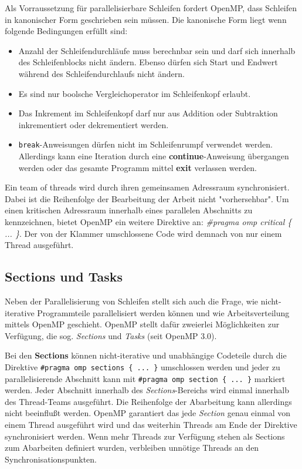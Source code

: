 \documentclass[11pt]{scrartcl}
\begin{document}
Als Vorraussetzung für parallelisierbare Schleifen fordert OpenMP, dass Schleifen in kanonischer Form geschrieben sein müssen. Die kanonische Form liegt wenn folgende Bedingungen erfüllt sind: 
\begin{itemize}
\item Anzahl der Schleifendurchläufe muss berechnbar sein und darf sich innerhalb des Schleifenblocks nicht ändern. Ebenso dürfen sich Start und Endwert während des Schleifendurchlaufs nicht ändern.
\item Es sind nur boolsche Vergleichoperator im Schleifenkopf erlaubt.
\item Das Inkrement im Schleifenkopf darf nur aus Addition oder Subtraktion inkrementiert oder dekrementiert werden. 
\item \texttt{break}-Anweisungen dürfen nicht im Schleifenrumpf verwendet werden. Allerdings kann eine Iteration durch eine \textbf{continue}-Anweisung übergangen werden oder das gesamte Programm mittel \textbf{exit} verlassen werden.
\end{itemize}

Ein team of threads wird durch ihren gemeinsamen Adressraum synchronisiert. Dabei ist die Reihenfolge der Bearbeitung der Arbeit nicht "vorhersehbar". Um einen kritischen Adressraum innerhalb eines parallelen Abschnitts zu kennzeichnen, bietet OpenMP ein weitere Direktive an: \textit{\#pragma omp critical \{ ... \}}. Der von der Klammer umschlossene Code wird demnach von nur einem Thread ausgeführt. 

\subsection{Sections und Tasks}

Neben der Parallelisierung von Schleifen stellt sich auch die Frage, wie nicht-iterative Programmteile parallelisiert werden können und  wie Arbeitsverteilung mittels OpenMP geschieht. OpenMP stellt dafür zweierlei Möglichkeiten zur Verfügung, die sog. \textit{Sections} und \textit{Tasks} (seit OpenMP 3.0).

Bei den \textbf{Sections} können nicht-iterative und unabhängige Codeteile durch die Direktive \texttt{\#pragma omp sections \{ ... \}} umschlossen werden und jeder zu parallelisierende Abschnitt kann mit \texttt{\#pragma omp section \{ ... \}} markiert werden. Jeder Abschnitt innerhalb des \textit{Sections}-Bereichs wird einmal innerhalb des Thread-Teams ausgeführt. Die Reihenfolge der Abarbeitung kann allerdings nicht beeinflußt werden. OpenMP garantiert das jede \textit{Section} genau einmal von einem Thread ausgeführt wird und das weiterhin Threads am Ende der Direktive synchronisiert werden. Wenn mehr Threads zur Verfügung stehen als Sections zum Abarbeiten definiert wurden, verbleiben unnötige Threads an den Synchronisationspunkten.
\end{document}
